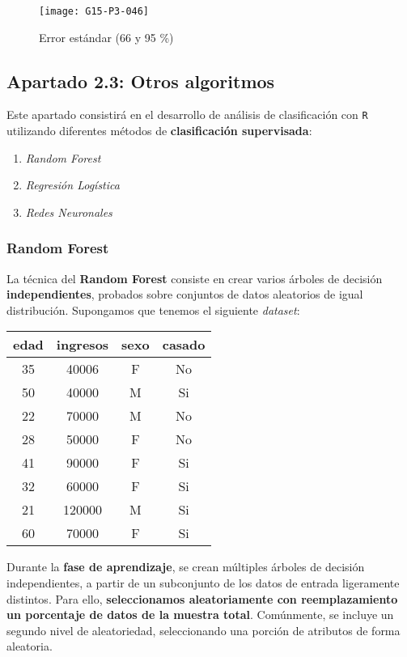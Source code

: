 \documentclass [a4paper] {article}
\begin{document}
\begin{figure}[h!]
\centering
\texttt{[image: G15-P3-046]}
\caption{Error estándar (66 y 95 \%)}
\end{figure}

\hfill \break
\hfill \break
\hfill \break
\hfill \break
\hfill \break
\hfill \break
\hfill \break
\hfill \break

\subsection{Apartado 2.3: Otros algoritmos}
Este apartado consistirá en el desarrollo de análisis de clasificación con \texttt{R} utilizando diferentes métodos de \textbf{clasificación supervisada}:
\begin{enumerate}
  \item \textit{Random Forest}
  \item \textit{Regresión Logística}
  \item \textit{Redes Neuronales}
\end{enumerate}

\subsubsection{Random Forest}
La técnica del \textbf{Random Forest} consiste en crear varios árboles de decisión \textbf{independientes}, probados sobre conjuntos de datos aleatorios de igual distribución. Supongamos que tenemos el siguiente \textit{dataset}:
\begin{center}
\begin{tabular}{ c c c c}
 edad & ingresos & sexo & casado \\
 \hline\hline
 35 & 40006 & F & No \\  
 50 & 40000 & M & Si \\
 22 & 70000 & M & No \\ 
 28 & 50000 & F & No \\
 41 & 90000 & F & Si \\
 32 & 60000 & F & Si \\
 21 & 120000 & M & Si \\
 60 & 70000 & F & Si \\
\end{tabular}
\end{center}
Durante la \textbf{fase de aprendizaje}, se crean múltiples árboles de decisión independientes, a partir de un subconjunto de los datos de entrada ligeramente distintos. Para ello, \textbf{seleccionamos aleatoriamente con reemplazamiento un porcentaje de datos de la muestra total}. Comúnmente, se incluye un segundo nivel de aleatoriedad, seleccionando una porción de atributos de forma aleatoria.
\end{document}
